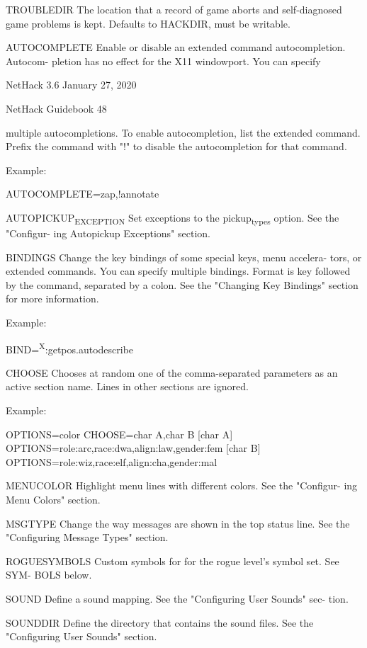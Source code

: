 \documentclass[11pt]{article}
\begin{document}
TROUBLEDIR
 The location that a record of game aborts and self-diagnosed
 game problems is kept. Defaults to HACKDIR, must be writable.

AUTOCOMPLETE
 Enable or disable an extended command autocompletion. Autocom-
 pletion has no effect for the X11 windowport. You can specify


NetHack 3.6                   January 27, 2020





NetHack Guidebook                       48



multiple autocompletions.  To enable autocompletion, list the
extended command. Prefix the command with "!" to disable the
autocompletion for that command.

Example:

AUTOCOMPLETE=zap,!annotate

AUTOPICKUP\textsubscript{EXCEPTION}
 Set exceptions to the pickup\textsubscript{types} option. See the "Configur-
 ing Autopickup Exceptions" section.

BINDINGS
 Change the key bindings of some special keys, menu accelera-
 tors, or extended commands. You can specify multiple bindings.
 Format is key followed by the command, separated by a colon.
 See the "Changing Key Bindings" section for more information.

Example:

BIND=\textsuperscript{X}:getpos.autodescribe

CHOOSE
 Chooses at random one of the comma-separated parameters as an
 active section name. Lines in other sections are ignored.

Example:

OPTIONS=color
CHOOSE=char A,char B
[char A]
OPTIONS=role:arc,race:dwa,align:law,gender:fem
[char B]
OPTIONS=role:wiz,race:elf,align:cha,gender:mal

MENUCOLOR
 Highlight menu lines with different colors. See the "Configur-
 ing Menu Colors" section.

MSGTYPE
 Change the way messages are shown in the top status line. See
 the "Configuring Message Types" section.

ROGUESYMBOLS
 Custom symbols for for the rogue level's symbol set. See SYM-
 BOLS below.

SOUND
 Define a sound mapping. See the "Configuring User Sounds" sec-
 tion.

SOUNDDIR
 Define the directory that contains the sound files.  See the
 "Configuring User Sounds" section.
\end{document}
